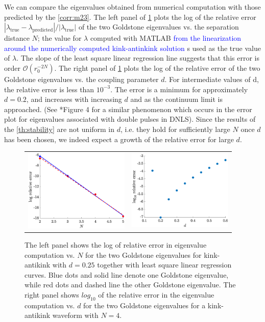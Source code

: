 \documentclass[12pt,reqno]{amsart}
\newcommand{\revisedd}[2]{ \textcolor{blue}{#1} }
\begin{document}
We can compare the eigenvalues obtained from numerical computation with those predicted by the \cref{corr:m23}. The left panel of \cref{fig:kakeigerror} plots the log of the relative error $| \lambda_{\text{true}} - \lambda_{\text{predicted}} |/| \lambda_{\text{true}} |$
of the two Goldstone eigenvalues vs. the separation distance $N$; the value for $\lambda$ computed with MATLAB \revisedd{from the linearization
around the numerically computed kink-antinkink solution} 
is used as the true value of $\lambda$.
The slope of the least square linear regression line suggests that this error is order $\mathcal{O}(r_0^{-2N})$. 
The right panel of \cref{fig:kakeigerror} plots the log of the relative error of the two Goldstone eigenvalues vs. the coupling parameter $d$. For intermediate values of d, the relative error is less than $10^{-3}$. The error is a minimum for approximately $d = 0.2$, and increases with increasing $d$ and as the
continuum limit is approached. (See \cite{Parker2020}*{Figure 4} for a similar phenomenon which occurs in the error plot for eigenvalues associated with double pulses in DNLS). Since the results of the \cref{th:stability} are not uniform in $d$, i.e. they hold for sufficiently large $N$ once $d$ has been chosen, we 
indeed expect a growth of the relative error for large $d$.

\begin{figure}[H]
	\begin{center}
	\begin{tabular}{cc}
	\includegraphics[width=5cm]{goldstoned025relerror.eps} &
	\includegraphics[width=5cm]{goldstoneN4relativeerror.eps}
	\end{tabular}
	\end{center}
	\caption{The left panel shows the log of relative error in eigenvalue computation vs. $N$ for the two Goldstone eigenvalues for kink-antikink with $d = 0.25$ together with least square linear regression curves. Blue dots and solid line denote one Goldstone eigenvalue, while red dots and dashed line the other Goldstone eigenvalue. The right panel shows $log_{10}$ of the relative error in the eigenvalue computation vs. $d$ for the two Goldstone eigenvalues for a kink-antikink waveform
	with $N = 4$.} 
	\label{fig:kakeigerror}
\end{figure}
\end{document}
